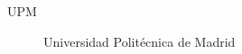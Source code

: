 \begin{acronyms}

\begin{description}
 
\item[UPM] Universidad Politécnica de Madrid  
 


\end{description}

\end{acronyms}
